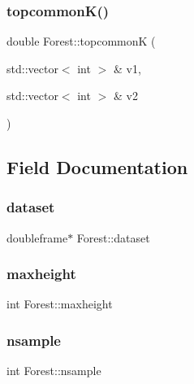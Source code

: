 \mbox{\label{classForest_a43ce9dc43658d70521aa2aee91b9a60a}} 
\subsubsection{\texorpdfstring{topcommon\+K()}{topcommonK()}}
{\footnotesize\ttfamily double Forest\+::topcommonK (\begin{DoxyParamCaption}\item[{std\+::vector$<$ int $>$ \&}]{v1,  }\item[{std\+::vector$<$ int $>$ \&}]{v2 }\end{DoxyParamCaption})\hspace{0.3cm}{\ttfamily [inline]}}



\subsection{Field Documentation}
\mbox{\label{classForest_ac3704ed2300734a73cba5b04a8f4b6ae}} 
\subsubsection{\texorpdfstring{dataset}{dataset}}
{\footnotesize\ttfamily doubleframe$\ast$ Forest\+::dataset}

\mbox{\label{classForest_a296ffbe5ca7db543740dda34c71771f5}} 
\subsubsection{\texorpdfstring{maxheight}{maxheight}}
{\footnotesize\ttfamily int Forest\+::maxheight}

\mbox{\label{classForest_a3a9831dba286e35fbe1f46ad9d363bf4}} 
\subsubsection{\texorpdfstring{nsample}{nsample}}
{\footnotesize\ttfamily int Forest\+::nsample}


